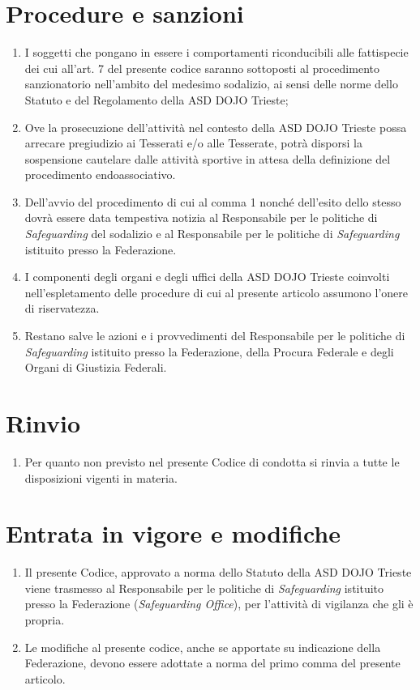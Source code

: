 \documentclass{djtsasddoc}
\begin{document}
	\section{Procedure e sanzioni}
	\begin{enumerate}
		\item I soggetti che pongano in essere i comportamenti riconducibili alle fattispecie dei cui all'art. 7 del presente codice saranno sottoposti al procedimento sanzionatorio nell'ambito del medesimo sodalizio, ai sensi delle norme dello Statuto e del Regolamento della ASD DOJO Trieste;
		\item Ove la prosecuzione dell'attività nel contesto della ASD DOJO Trieste possa arrecare pregiudizio ai Tesserati e/o alle Tesserate, potrà disporsi la sospensione cautelare dalle attività sportive in attesa della definizione del procedimento endoassociativo.
		\item Dell'avvio del procedimento di cui al comma 1 nonché dell'esito dello stesso dovrà essere data tempestiva notizia al Responsabile per le politiche di \textit{Safeguarding} del sodalizio e al Responsabile per le politiche di \textit{Safeguarding} istituito presso la Federazione.
		\item I componenti degli organi e degli uffici della ASD DOJO Trieste coinvolti nell'espletamento delle procedure di cui al presente articolo assumono l'onere di riservatezza.
		\item Restano salve le azioni e i provvedimenti del Responsabile per le politiche di \textit{Safeguarding} istituito presso la Federazione, della Procura Federale e degli Organi di Giustizia Federali.
	\end{enumerate}
	
	\section{Rinvio}
	\begin{enumerate}
		\item Per quanto non previsto nel presente Codice di condotta si rinvia a tutte le disposizioni vigenti in materia.
	\end{enumerate}
	
	\section{Entrata in vigore e modifiche}
	\begin{enumerate}
		\item Il presente Codice, approvato a norma dello Statuto della ASD DOJO Trieste viene trasmesso al Responsabile per le politiche di \textit{Safeguarding} istituito presso la Federazione (\textit{Safeguarding Office}), per l'attività di vigilanza che gli è propria.
		\item Le modifiche al presente codice, anche se apportate su indicazione della Federazione, devono essere adottate a norma del primo comma del presente articolo.
	\end{enumerate}
\end{document}

